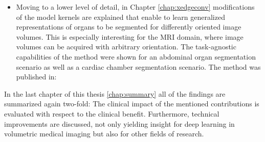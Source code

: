 \begin{itemize}
                \item
                    Moving to a lower level of detail, in Chapter \ref{chap:xedgeconv} modifications of the model kernels are explained that enable to learn generalized representations of organs to be segmented for differently oriented image volumes. This is especially interesting for the MRI domain, where image volumes can be acquired with arbitrary orientation.
                    The task-agnostic capabilities of the method were shown for an abdominal organ segmentation scenario as well as a cardiac chamber segmentation scenario.
                    The method was published in:

                    \vspace{1em}
                    \noindent{}


            \end{itemize}

            In the last chapter of this thesis \ref{chap:summary}  all of the findings are summarized again two-fold: The clinical impact of the mentioned contributions is evaluated with respect to the clinical benefit.
            Furthermore, technical improvements are discussed, not only yielding insight for deep learning in volumetric medical imaging but also for other fields of research.

